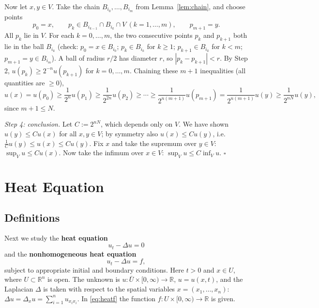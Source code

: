 \documentclass[11pt]{article}
\theoremstyle{plain}
\theoremstyle{definition}
\theoremstyle{remark}
\begin{document}
Now let $x, y \in V$. Take the chain $B_{i_0}, \dots, B_{i_m}$ from Lemma~\ref{lem:chain}, and choose points
$$ p_0 = x, \qquad p_k \in B_{i_{k-1}} \cap B_{i_k} \cap V \ (k = 1,\dots,m), \qquad p_{m+1} = y. $$
All $p_k$ lie in $V$. For each $k = 0, \dots, m$, the two consecutive points $p_k$ and $p_{k+1}$ both lie in the ball $B_{i_k}$ (check: $p_0 = x \in B_{i_0}$; $p_k \in B_{i_k}$ for $k \geq 1$; $p_{k+1} \in B_{i_k}$ for $k < m$; $p_{m+1} = y \in B_{i_m}$). A ball of radius $r/2$ has diameter $r$, so $|p_k - p_{k+1}| < r$. By Step 2, $u(p_k) \geq 2^{-n}u(p_{k+1})$ for $k = 0,\dots,m$. Chaining these $m+1$ inequalities (all quantities are $\geq 0$),
$$ u(x) = u(p_0) \geq \frac{1}{2^n}u(p_1) \geq \frac{1}{2^{2n}}u(p_2) \geq \cdots \geq \frac{1}{2^{n(m+1)}}u(p_{m+1}) = \frac{1}{2^{n(m+1)}}u(y) \geq \frac{1}{2^{nN}}u(y), $$
since $m + 1 \leq N$.

\emph{Step 4: conclusion.} Let $C := 2^{nN}$, which depends only on $V$. We have shown $u(y) \leq C u(x)$ for all $x, y \in V$; by symmetry also $u(x) \le C u(y)$, i.e.\ $\frac1C u(y) \leq u(x) \leq Cu(y)$. Fix $x$ and take the supremum over $y \in V$: $\sup_V u \leq C u(x)$. Now take the infimum over $x \in V$: $\sup_V u \leq C\inf_V u$. $\square$

\newpage
\section{Heat Equation}\label{sec:heat}

\subsection{Definitions}

Next we study the \textbf{heat equation}
\begin{equation}\label{eq:heat}
u_t - \Delta u = 0
\end{equation}
and the \textbf{nonhomogeneous heat equation}
\begin{equation}\label{eq:heatf}
u_t - \Delta u = f,
\end{equation}
subject to appropriate initial and boundary conditions. Here $t > 0$ and $x \in U$, where $U \subset \mathbb{R}^n$ is open. The unknown is $u : \bar U \times [0,\infty) \to \mathbb{R}$, $u = u(x,t)$, and the Laplacian $\Delta$ is taken with respect to the spatial variables $x = (x_1,\dots,x_n)$: $\Delta u = \Delta_x u = \sum_{i=1}^n u_{x_i x_i}$. In \eqref{eq:heatf} the function $f : U \times [0,\infty) \to \mathbb{R}$ is given.
\end{document}
